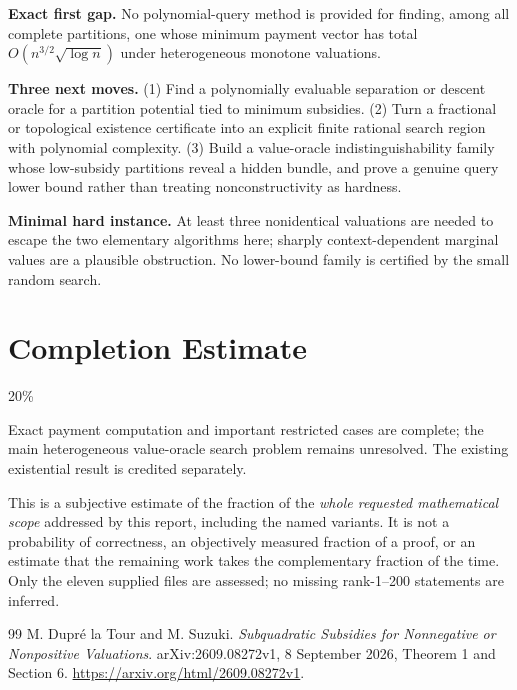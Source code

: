 \documentclass[11pt,a4paper]{article}
\theoremstyle{remark}\newtheorem{remark}[theorem]{Remark}
\begin{document}
\textbf{Exact first gap.} No polynomial-query method is provided for finding, among all complete partitions, one whose minimum payment vector has total $O(n^{3/2}\sqrt{\log n})$ under heterogeneous monotone valuations.

\textbf{Three next moves.} (1) Find a polynomially evaluable separation or descent oracle for a partition potential tied to minimum subsidies. (2) Turn a fractional or topological existence certificate into an explicit finite rational search region with polynomial complexity. (3) Build a value-oracle indistinguishability family whose low-subsidy partitions reveal a hidden bundle, and prove a genuine query lower bound rather than treating nonconstructivity as hardness.

\textbf{Minimal hard instance.} At least three nonidentical valuations are needed to escape the two elementary algorithms here; sharply context-dependent marginal values are a plausible obstruction. No lower-bound family is certified by the small random search.

\section{Completion Estimate}
20\%

Exact payment computation and important restricted cases are complete; the main heterogeneous value-oracle search problem remains unresolved. The existing existential result is credited separately.

This is a subjective estimate of the fraction of the \emph{whole requested mathematical scope} addressed by this report, including the named variants. It is not a probability of correctness, an objectively measured fraction of a proof, or an estimate that the remaining work takes the complementary fraction of the time. Only the eleven supplied files are assessed; no missing rank-1--200 statements are inferred.

\begin{thebibliography}{99}
 M. Dupr\'e la Tour and M. Suzuki. \emph{Subquadratic Subsidies for Nonnegative or Nonpositive Valuations}. arXiv:2609.08272v1, 8 September 2026, Theorem 1 and Section 6. \url{https://arxiv.org/html/2609.08272v1}.
\end{thebibliography}
\end{document}
